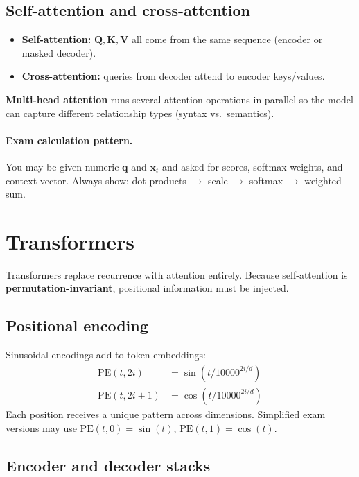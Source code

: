 \subsection{Self-attention and cross-attention}

\begin{itemize}
  \item \textbf{Self-attention:} $\mathbf{Q}, \mathbf{K}, \mathbf{V}$ all come from the same sequence (encoder or masked decoder).
  \item \textbf{Cross-attention:} queries from decoder attend to encoder keys/values.
\end{itemize}

\textbf{Multi-head attention} runs several attention operations in parallel so the model can capture different relationship types (syntax vs.\ semantics).

\paragraph{Exam calculation pattern.} You may be given numeric $\mathbf{q}$ and $\mathbf{x}_t$ and asked for scores, softmax weights, and context vector. Always show: dot products $\rightarrow$ scale $\rightarrow$ softmax $\rightarrow$ weighted sum.

\section{Transformers}

Transformers replace recurrence with attention entirely. Because self-attention is \textbf{permutation-invariant}, positional information must be injected.

\subsection{Positional encoding}

Sinusoidal encodings add to token embeddings:
\begin{align*}
\mathrm{PE}(t, 2i) &= \sin\left(t / 10000^{2i/d}\right) \\
\mathrm{PE}(t, 2i+1) &= \cos\left(t / 10000^{2i/d}\right)
\end{align*}
Each position receives a unique pattern across dimensions. Simplified exam versions may use $\mathrm{PE}(t,0)=\sin(t)$, $\mathrm{PE}(t,1)=\cos(t)$.

\subsection{Encoder and decoder stacks}

